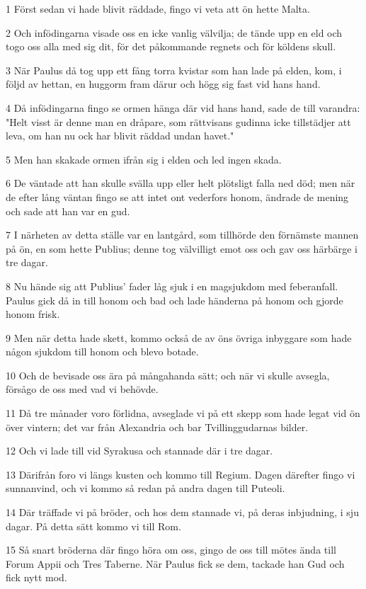 \par 1 Först sedan vi hade blivit räddade, fingo vi veta att ön hette Malta.
\par 2 Och infödingarna visade oss en icke vanlig välvilja; de tände upp en eld och togo oss alla med sig dit, för det påkommande regnets och för köldens skull.
\par 3 När Paulus då tog upp ett fång torra kvistar som han lade på elden, kom, i följd av hettan, en huggorm fram därur och högg sig fast vid hans hand.
\par 4 Då infödingarna fingo se ormen hänga där vid hans hand, sade de till varandra: "Helt visst är denne man en dråpare, som rättvisans gudinna icke tillstädjer att leva, om han nu ock har blivit räddad undan havet."
\par 5 Men han skakade ormen ifrån sig i elden och led ingen skada.
\par 6 De väntade att han skulle svälla upp eller helt plötsligt falla ned död; men när de efter lång väntan fingo se att intet ont vederfors honom, ändrade de mening och sade att han var en gud.
\par 7 I närheten av detta ställe var en lantgård, som tillhörde den förnämste mannen på ön, en som hette Publius; denne tog välvilligt emot oss och gav oss härbärge i tre dagar.
\par 8 Nu hände sig att Publius' fader låg sjuk i en magsjukdom med feberanfall. Paulus gick då in till honom och bad och lade händerna på honom och gjorde honom frisk.
\par 9 Men när detta hade skett, kommo också de av öns övriga inbyggare som hade någon sjukdom till honom och blevo botade.
\par 10 Och de bevisade oss ära på mångahanda sätt; och när vi skulle avsegla, försågo de oss med vad vi behövde.
\par 11 Då tre månader voro förlidna, avseglade vi på ett skepp som hade legat vid ön över vintern; det var från Alexandria och bar Tvillinggudarnas bilder.
\par 12 Och vi lade till vid Syrakusa och stannade där i tre dagar.
\par 13 Därifrån foro vi längs kusten och kommo till Regium. Dagen därefter fingo vi sunnanvind, och vi kommo så redan på andra dagen till Puteoli.
\par 14 Där träffade vi på bröder, och hos dem stannade vi, på deras inbjudning, i sju dagar. På detta sätt kommo vi till Rom.
\par 15 Så snart bröderna där fingo höra om oss, gingo de oss till mötes ända till Forum Appii och Tres Taberne. När Paulus fick se dem, tackade han Gud och fick nytt mod.
